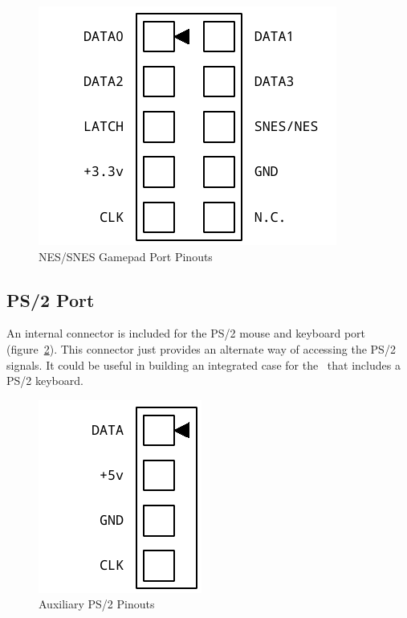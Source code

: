 \begin{figure}[ht]
    \begin{center}
        \includegraphics[scale=0.65]{images/f256_port_nes.pdf}
    \end{center}
    \caption{NES/SNES Gamepad Port Pinouts}
    \label{fig:port_nes}
\end{figure}

\subsection*{PS/2 Port}

An internal connector is included for the PS/2 mouse and keyboard port (figure~\ref{fig:port_ps2}). This connector just provides an alternate way of accessing the PS/2 signals. It could be useful in building an integrated case for the \jr\ that includes a PS/2 keyboard.

\begin{figure}[ht]
    \begin{center}
        \includegraphics[scale=0.65]{images/f256_port_ps2.pdf}
    \end{center}
    \caption{Auxiliary PS/2 Pinouts}
    \label{fig:port_ps2}
\end{figure}

